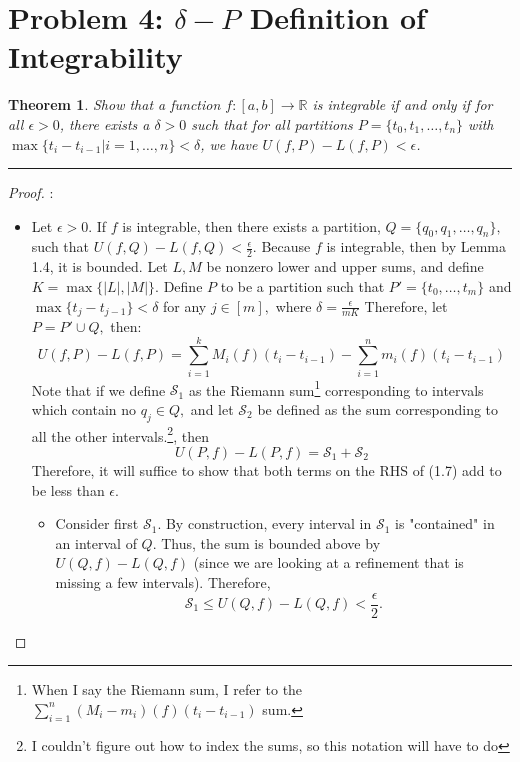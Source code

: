 \documentclass[openany, amssymb, psamsfonts]{amsart}
\newcommand{\bbR}{\mathbb{R}}
\newtheorem{thm}{Theorem}[section]
\theoremstyle{definition}
\numberwithin{equation}{section}
\begin{document}
\section*{Problem 4: $\delta - P$ Definition of Integrability}
\begin{thm}
Show that a function $f : [a, b] \to \bbR$ is integrable if and only
if for all $\epsilon > 0$, there exists a $\delta > 0$ such that for all partitions $P = \{t_0, t_1, \dots, t_n\}$
with $\max\{t_i - t_{i-1} | i = 1, \dots, n\} < \delta$, we have $U (f, P ) - L(f, P ) < \epsilon$.
\end{thm}
\vspace{4pt}     \hrule   \vspace{4pt}\begin{proof}:\\
\begin{itemize}
\item Let $\epsilon>0.$ If $f$ is integrable, then there exists a partition, $Q = \{q_0, q_1, \dots, q_n\},$ such that $U(f,Q) - L(f,Q)< \frac{\epsilon}{2}.$ Because $f$ is integrable, then by Lemma 1.4, it is bounded. Let $L,M$ be nonzero lower and upper sums, and define $K = \max\{|L|, |M|\}.$ Define $P$ to be a partition such that $P' = \{t_0, \dots, t_m\}$ and $\max\{t_{j} - t_{j-1}\}< \delta$ for any $j \in [m],$ where $\delta = \frac{\epsilon}{mK}$ Therefore, let $P = P' \cup Q,$ then:
\[U(f,P)- L(f,P) = \displaystyle\sum_{i=1}^kM_i(f)(t_{i} - t_{i-1}) - \sum_{i=1}^nm_i(f)(t_{i} - t_{i-1})\] 
Note that if we define $\mathcal{S}_1$ as the Riemann sum\footnote{When I say the Riemann sum, I refer to the $\displaystyle\sum_{i=1}^n(M_i-m_i)(f)(t_i-t_{i-1})$ sum.} corresponding to intervals which contain no $q_j \in Q,$ and let $\mathcal{S}_2$ be defined as the sum corresponding to all the other intervals.\footnote{I couldn't figure out how to index the sums, so this notation will have to do}, then \begin{equation}
U(P,f) - L(P,f) = \mathcal{S}_1 + \mathcal{S}_2
\end{equation} Therefore, it will suffice to show that both terms on the RHS of (1.7) add to be less than $\epsilon.$
\begin{itemize}
\item Consider first $\mathcal{S}_1.$ By construction, every interval in $\mathcal{S}_1$ is "contained" in an interval of $Q.$ Thus, the sum is bounded above by $U(Q,f) - L(Q,f)$ (since we are looking at a refinement that is missing a few intervals). Therefore, 
\begin{equation}\mathcal{S}_1 \leq U(Q,f) - L(Q,f) < \frac{\epsilon}{2}.

\end{equation}
\end{itemize}
\end{itemize}
\end{proof}
\end{document}
